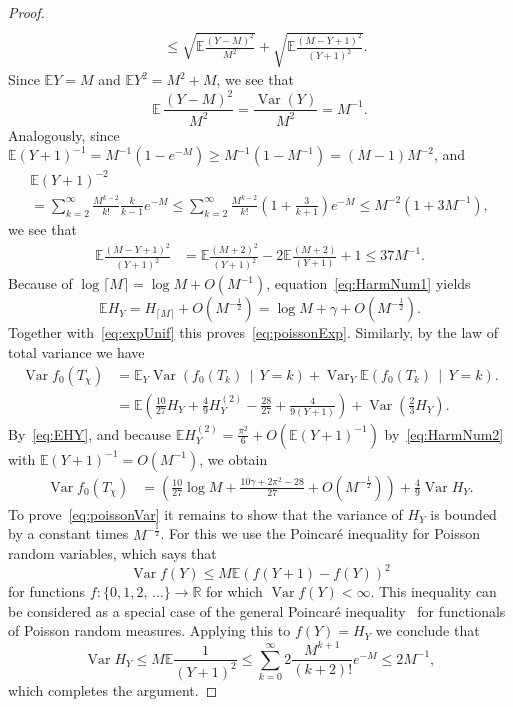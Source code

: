 \documentclass[AHL,Unicode,longabstracts,published]{cedram}
\newcommand{\var}{\operatorname{Var}}
\newcommand{\bbR}{\mathbb{R}}
\newcommand{\bbE}{\mathbb{E}}
\begin{document}
\begin{proof}
\begin{align*}
\\ & \leq
\sqrt{\bbE \frac {(Y-M)^2}{M^2}} + \sqrt{\bbE \frac {(M-Y+1)^2}{(Y+1)^2}}.
\end{align*}
Since $\bbE Y=M$ and $\bbE Y^2 = M^2 + M $, we see that
\[
\bbE \, \frac{(Y-M)^2}{M^2} = \frac{\var(Y)}{M^2}= M^{-1}.
\]
Analogously, since $
\bbE (Y+1)^{-1} = M^{-1} (1 - e^{-M})
\geq M^{-1} (1- M^{-1}) = (M-1) M^{-2} $, and
\begin{multline*}
\bbE (Y+1)^{-2} \\
= \sum_{k=2}^\infty \frac {M^{k-2}} {k!} \frac {k} {k-1} e^{-M}
\leq
\sum_{k=2}^\infty \frac {M^{k-2}} {k!} \left(1+\frac {3} {k+1} \right) e^{-M}
\leq M^{-2} \left(1+ 3 M^{-1}\right),
\end{multline*}
we see that
\begin{align*}
\bbE \frac {(M-Y+1)^2}{(Y+1)^2} &=
\bbE \frac {(M+2)^2}{(Y+1)^2} -2 \bbE \frac {(M+2)}{(Y+1)} + 1
\leq 37 M^{-1}.
\end{align*}
Because of $\log \lceil M\rceil= \log M + O(M^{-1})$, equation~\eqref{eq:HarmNum1} yields
\begin{equation}\label{eq:EHY}
\bbE H_Y = H_{\lceil M\rceil} + O\left(M^{-\frac 12}\right) = \log M + \gamma + O\left(M^{-\frac 12}\right).
\end{equation}
Together with~\eqref{eq:expUnif} this proves~\eqref{eq:poissonExp}. Similarly, by the law of total variance we have
\begin{align*}
\var f_0(T_{\chi}) &=
\bbE_Y \var \left(f_0(T_{k})\,\middle|\,Y=k\right) + \var_Y \bbE \left(f_0(T_k)\,\middle|\,Y=k\right).
\\ &=
\bbE \left(\frac {10}{27} H_Y + \frac{4}{9} H^{(2)}_Y - \frac{28}{27 } + \frac{4}{9(Y+1)}\right) + \var \left(\frac 23 H_Y \right).
\end{align*}
By~\eqref{eq:EHY}, and because $ \bbE H^{(2)}_Y = \frac{\pi^2}6+O(\bbE (Y+1)^{-1})$ by~\eqref{eq:HarmNum2} with $\bbE (Y+1)^{-1} = O(M^{-1}) $, we obtain
\begin{align*}
\var f_0(T_{\chi}) &=
\left(\frac {10}{27} \log M + \frac{10 \gamma + 2\pi^2 - 28 }{27} + O\left(M^{-\frac 12}\right) \right) + \frac 49 \var H_Y.
\end{align*}
To prove~\eqref{eq:poissonVar} it remains to show that the variance of $H_Y$ is bounded by a constant times $M^{-\frac 12}$. For this we use the Poincaré inequality for Poisson random variables, which says that
\[
\var f(Y) \leq M \bbE (f(Y+1)-f(Y))^2
\]
for functions $f:\{0,1,2,\,\ldots\}\to\bbR$ for which $\var f(Y)<\infty$. This inequality can be considered as a special case of the general Poincaré inequality~\cite[Theorem~18.7]{LP} for functionals of Poisson random measures. Applying this to $f(Y)=H_Y$ we conclude that
\[
\var H_Y
\leq M \bbE \frac 1{(Y+1)^2}
\leq
\sum\limits_{k=0}^{\infty} 2 \frac{M^{k+1}}{(k+2)!} e^{-M} \leq 2 M^{-1},
\]
which completes the argument.
\end{proof}
\end{document}
